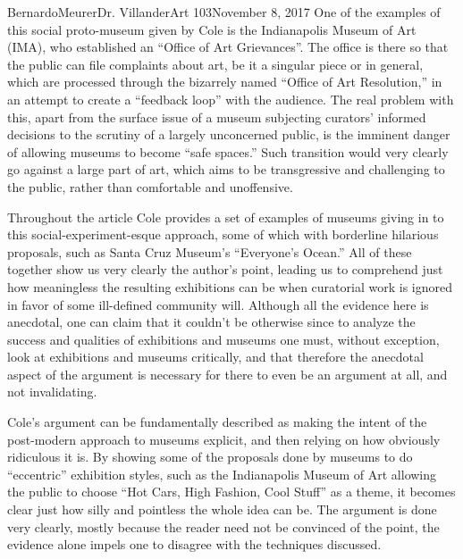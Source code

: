 \documentclass[12pt,letterpaper]{article}
\begin{document}
\begin{mla}{Bernardo}{Meurer}{Dr. Villander}{Art 103}{November 8, 2017}
        One of the examples of this social proto-museum given by Cole is the Indianapolis Museum of Art (IMA), who established an ``Office of Art Grievances''. The office is there so that the public can file complaints about art, be it a singular piece or in general, which are processed through the bizarrely named ``Office of Art Resolution,'' in an attempt to create a ``feedback loop'' with the audience. The real problem with this, apart from the surface issue of a museum subjecting curators' informed decisions to the scrutiny of a largely unconcerned public, is the imminent danger of allowing museums to become ``safe spaces.'' Such transition would very clearly go against a large part of art, which aims to be transgressive and challenging to the public, rather than comfortable and unoffensive.

        Throughout the article Cole provides a set of examples of museums giving in to this social-experiment-esque approach, some of which with borderline hilarious proposals, such as Santa Cruz Museum's ``Everyone's Ocean.'' All of these together show us very clearly the author's point, leading us to comprehend just how meaningless the resulting exhibitions can be when curatorial work is ignored in favor of some ill-defined community will. Although all the evidence here is anecdotal, one can claim that it couldn't be otherwise since to analyze the success and qualities of exhibitions and museums one must, without exception, look at exhibitions and museums critically, and that therefore the anecdotal aspect of the argument is necessary for there to even be an argument at all, and not invalidating.
    
        Cole's argument can be fundamentally described as making the intent of the post-modern approach to museums explicit, and then relying on how obviously ridiculous it is. By showing some of the proposals done by museums to do ``eccentric'' exhibition styles, such as the Indianapolis Museum of Art allowing the public to choose ``Hot Cars, High Fashion, Cool Stuff'' as a theme, it becomes clear just how silly and pointless the whole idea can be. The argument is done very clearly, mostly because the reader need not be convinced of the point, the evidence alone impels one to disagree with the techniques discussed. 


\end{mla}
\end{document}
